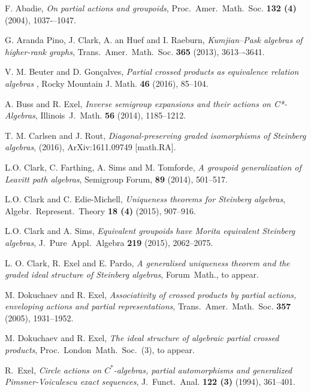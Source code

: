\documentclass[11pt, a4paper]{amsart}
\theoremstyle{plain}
\begin{document}
\begin{thebibliography}{99}

 F. Abadie, \textit{On partial actions and groupoids}, Proc.\ Amer.\ Math.\ Soc. {\bf 132 (4)} (2004),  1037-–1047.

 G. Aranda Pino, J. Clark, A. an Huef and I. Raeburn, \textit{Kumjian–Pask algebras of higher-rank graphs},
Trans.\ Amer.\ Math.\ Soc. {\bf 365} (2013), 3613–-3641.

 V. M. Beuter and D. Gonçalves, \textit{ Partial crossed products as equivalence relation algebras }, Rocky Mountain J. Math. {\bf 46} (2016), 85--104.

 A. Buss and R. Exel, \textit{ Inverse semigroup expansions and their actions on C*-Algebras}, Illinois\ J.\ Math. {\bf 56} (2014), 1185--1212.

 T. M. Carlsen and J. Rout, \textit{ Diagonal-preserving graded isomorphisms of Steinberg algebras}, (2016), ArXiv:1611.09749 [math.RA].

 L.O. Clark, C. Farthing, A. Sims and M. Tomforde, \textit{A groupoid generalization of Leavitt path
algebras}, Semigroup Forum, {\bf 89} (2014), 501--517.

 L.O. Clark and C. Edie-Michell, \textit{Uniqueness theorems for Steinberg algebras}, Algebr.\ Represent.\ Theory {\bf 18 (4)} (2015), 907--916.

 L.O. Clark and A. Sims, \textit{ Equivalent groupoids have Morita equivalent Steinberg algebras}, J.\ Pure\
Appl.\ Algebra {\bf 219} (2015), 2062--2075.

 L. O. Clark, R. Exel and E. Pardo, \textit{ A generalised uniqueness theorem and the graded ideal structure of Steinberg algebras}, Forum\ Math., to appear.

 M. Dokuchaev and R. Exel, \textit{Associativity of crossed products by partial actions, enveloping actions and partial representations}, Trans.\ Amer.\ Math.\ Soc. {\bf 357} (2005), 1931--1952.

 M. Dokuchaev and R. Exel, \textit{The ideal structure of algebraic partial crossed products}, Proc.\ London\ Math.\ Soc.\ (3), to appear.

 R.\ Exel, \textit{Circle actions on $C^*$-algebras, partial automorphisms and generalized Pimsner-Voiculescu exact sequences}, J.\ Funct.\ Anal. {\bf 122 (3)} (1994), 361--401.


\end{thebibliography}
\end{document}
